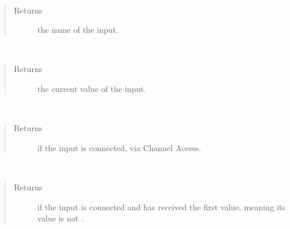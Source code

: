 \documentclass[letterpaper,10pt,english]{sphinxmanual}
\begin{document}
\begin{fulllineitems}
\label{\detokenize{io:ioname}}~\begin{quote}\begin{description}
\item[{Returns}] \leavevmode
the name of the input.

\end{description}\end{quote}

\end{fulllineitems}


\begin{fulllineitems}
\label{\detokenize{io:val}}~\begin{quote}\begin{description}
\item[{Returns}] \leavevmode
the current value of the input.

\end{description}\end{quote}

\end{fulllineitems}


\begin{fulllineitems}
\label{\detokenize{io:connected}}~\begin{quote}\begin{description}
\item[{Returns}] \leavevmode
{} if the input is connected, via Channel Access.

\end{description}\end{quote}

\end{fulllineitems}


\begin{fulllineitems}
\label{\detokenize{io:initialized}}~\begin{quote}\begin{description}
\item[{Returns}] \leavevmode
{} if the input is connected and has received the first value, meaning its value is not .

\end{description}\end{quote}

\end{fulllineitems}
\end{document}
